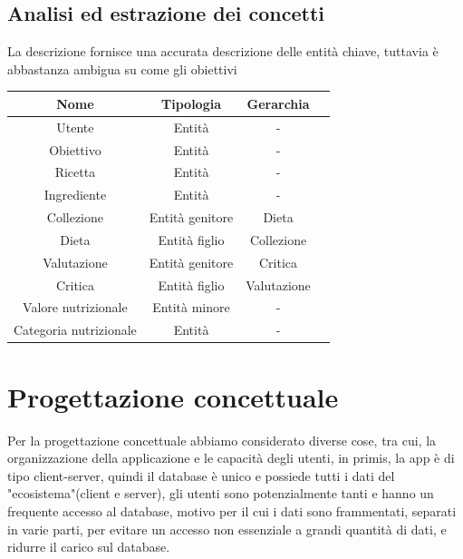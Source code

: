 ﻿\documentclass[a4paper,12pt]{report}
\begin{document}
\section{Analisi ed estrazione dei concetti}
La descrizione fornisce una accurata descrizione delle entità chiave, tuttavia è abbastanza ambigua su come gli obiettivi
\begin{table}[h!]
    \centering
    \begin{tabular}{ |c|c|c|c| }
        \hline
        \scriptsize{\textbf{Nome}} & \scriptsize{\textbf{Tipologia}} & \scriptsize{\textbf{Gerarchia}} \\
        \hline
        \scriptsize{Utente} & \scriptsize{Entità} & \scriptsize{-} \\
        \hline
        \scriptsize{Obiettivo} & \scriptsize{Entità} & \scriptsize{-} \\
        \hline
        \scriptsize{Ricetta} & \scriptsize{Entità} & \scriptsize{-} \\
        \hline
        \scriptsize{Ingrediente} & \scriptsize{Entità} & \scriptsize{-} \\
        \hline
        \scriptsize{Collezione} & \scriptsize{Entità genitore} & \scriptsize{Dieta} \\
        \hline
        \scriptsize{Dieta} & \scriptsize{Entità figlio} & \scriptsize{Collezione} \\
        \hline
        \scriptsize{Valutazione} & \scriptsize{Entità genitore} & \scriptsize{Critica} \\
        \hline
        \scriptsize{Critica} & \scriptsize{Entità figlio} & \scriptsize{Valutazione} \\
        \hline
        \scriptsize{Valore nutrizionale} & \scriptsize{Entità minore} & \scriptsize{-} \\
        \hline
        \scriptsize{Categoria nutrizionale} & \scriptsize{Entità} & \scriptsize{-} \\
        \hline
    \end{tabular}
\end{table}

\chapter{Progettazione concettuale}
Per la progettazione concettuale abbiamo considerato diverse cose,
tra cui, la organizzazione della applicazione e le capacità degli utenti,
in primis, la app è di tipo client-server, quindi il database è unico e
possiede tutti i dati del "ecosistema"(client e server), gli utenti sono potenzialmente tanti
e hanno un frequente accesso al database, motivo per il cui i dati sono
frammentati, separati in varie parti, per evitare un accesso non essenziale a grandi quantità di dati, e ridurre il carico sul database.    
\end{document}
